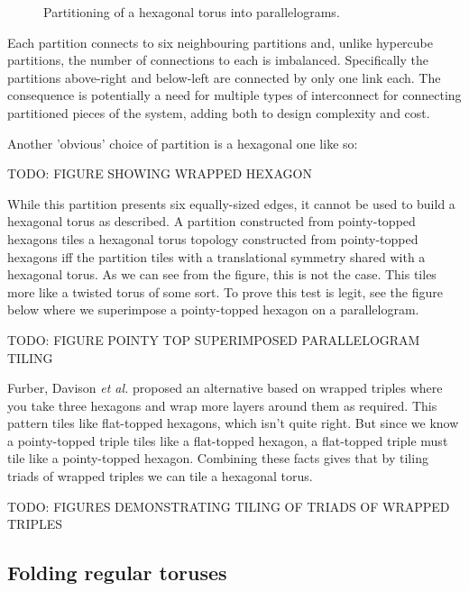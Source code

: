 			\begin{figure}
				\center
				
				
				\caption{Partitioning of a hexagonal torus into parallelograms.}
				\label{fig:parallelogramPartitioning}
			\end{figure}
			
			Each partition connects to six neighbouring partitions and, unlike
			hypercube partitions, the number of connections to each is imbalanced.
			Specifically the partitions above-right and below-left are connected by
			only one link each. The consequence is potentially a need for multiple
			types of interconnect for connecting partitioned pieces of the system,
			adding both to design complexity and cost.
			
			Another 'obvious' choice of partition is a hexagonal one like so:
			
			TODO: FIGURE SHOWING WRAPPED HEXAGON
			
			While this partition presents six equally-sized edges, it cannot be used
			to build a hexagonal torus as described. A partition constructed from
			pointy-topped hexagons tiles a hexagonal torus topology constructed from
			pointy-topped hexagons iff the partition tiles with a translational
			symmetry shared with a hexagonal torus. As we can see from the figure,
			this is not the case. This tiles more like a twisted torus of some sort.
			To prove this test is legit, see the figure below where we superimpose a
			pointy-topped hexagon on a parallelogram.
			
			TODO: FIGURE POINTY TOP SUPERIMPOSED PARALLELOGRAM TILING
			
			Furber, Davison \emph{et al.} \cite{davidsonWiring} proposed an
			alternative based on wrapped triples where you take three hexagons and
			wrap more layers around them as required. This pattern tiles like
			flat-topped hexagons, which isn't quite right. But since we know a
			pointy-topped triple
			tiles like a flat-topped hexagon, a flat-topped triple must tile like a
			pointy-topped hexagon. Combining these facts gives that by tiling triads
			of wrapped triples we can tile a hexagonal torus.
			
			TODO: FIGURES DEMONSTRATING TILING OF TRIADS OF WRAPPED TRIPLES
		
		\subsection{Folding regular toruses}
			
